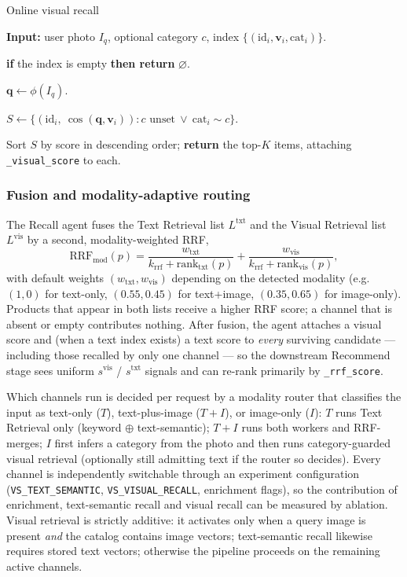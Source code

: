 \begin{chalgorithm}{Online visual recall}\label{alg:vrecall}
  \item \textbf{Input:} user photo $I_q$, optional category $c$, index
        $\{(\mathrm{id}_i,\mathbf{v}_i,\mathrm{cat}_i)\}$.
  \item \textbf{if} the index is empty \textbf{then return} $\varnothing$.
  \item $\mathbf{q}\gets\phi(I_q)$.
  \item $S \gets \{(\mathrm{id}_i,\ \cos(\mathbf{q},\mathbf{v}_i)) : c\text{ unset}\ \lor\ \mathrm{cat}_i\sim c\}$.
  \item Sort $S$ by score in descending order; \textbf{return} the top-$K$ items,
        attaching \texttt{\_visual\_score} to each.
\end{chalgorithm}

\subsubsection{Fusion and modality-adaptive routing}
\label{sec:fusion}

The Recall agent fuses the Text Retrieval list $L^{\mathrm{txt}}$ and the Visual
Retrieval list $L^{\mathrm{vis}}$ by a second, modality-weighted RRF,
\begin{equation}
  \mathrm{RRF}_{\mathrm{mod}}(p)=
  \frac{w_{\mathrm{txt}}}{k_{\mathrm{rrf}}+\mathrm{rank}_{\mathrm{txt}}(p)}
  +\frac{w_{\mathrm{vis}}}{k_{\mathrm{rrf}}+\mathrm{rank}_{\mathrm{vis}}(p)},
  \label{eq:rrf-mod}
\end{equation}
with default weights $(w_{\mathrm{txt}},w_{\mathrm{vis}})$ depending on the
detected modality (e.g.\ $(1,0)$ for text-only, $(0.55,0.45)$ for text+image,
$(0.35,0.65)$ for image-only). Products that appear in both lists receive a
higher RRF score; a channel that is absent or empty contributes nothing. After
fusion, the agent attaches a visual score and (when a text index exists) a text
score to \emph{every} surviving candidate --- including those recalled by only
one channel --- so the downstream Recommend stage sees uniform
$s^{\mathrm{vis}}$ / $s^{\mathrm{txt}}$ signals and can re-rank primarily by
\texttt{\_rrf\_score}.

Which channels run is decided per request by a modality router that classifies
the input as text-only ($T$), text-plus-image ($T{+}I$), or image-only ($I$):
$T$ runs Text Retrieval only (keyword $\oplus$ text-semantic); $T{+}I$ runs both
workers and RRF-merges; $I$ first infers a category from the photo and then runs
category-guarded visual retrieval (optionally still admitting text if the
router so decides). Every channel is independently switchable through an
experiment configuration (\texttt{VS\_TEXT\_SEMANTIC}, \texttt{VS\_VISUAL\_RECALL},
enrichment flags), so the contribution of enrichment, text-semantic recall and
visual recall can be measured by ablation. Visual retrieval is strictly
additive: it activates only when a query image is present \emph{and} the catalog
contains image vectors; text-semantic recall likewise requires stored text
vectors; otherwise the pipeline proceeds on the remaining active channels.
